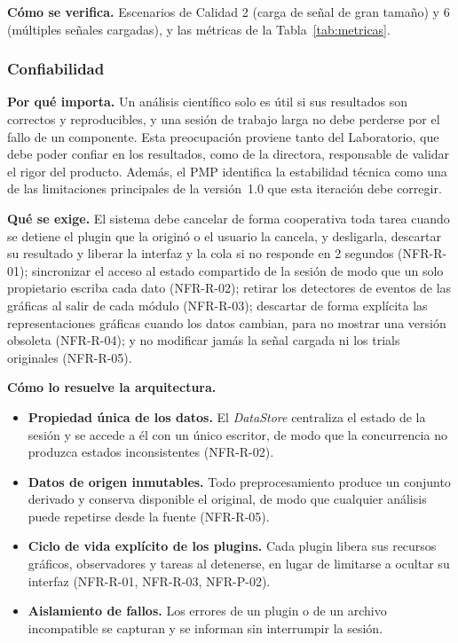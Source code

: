 \documentclass[11pt,a4paper]{article}
\DeclareRobustCommand{\_}{\textunderscore\allowbreak}
\begin{document}
\textbf{Cómo se verifica.} Escenarios de Calidad 2 (carga de señal de gran tamaño) y 6 (múltiples señales cargadas), y las métricas de la Tabla~\ref{tab:metricas}.

\subsubsection{Confiabilidad}

\textbf{Por qué importa.} Un análisis científico solo es útil si sus resultados son correctos y reproducibles, y una sesión de trabajo larga no debe perderse por el fallo de un componente. Esta preocupación proviene tanto del Laboratorio, que debe poder confiar en los resultados, como de la directora, responsable de validar el rigor del producto. Además, el PMP identifica la estabilidad técnica como una de las limitaciones principales de la versión~1.0 que esta iteración debe corregir.

\textbf{Qué se exige.} El sistema debe cancelar de forma cooperativa toda tarea cuando se detiene el plugin que la originó o el usuario la cancela, y desligarla, descartar su resultado y liberar la interfaz y la cola si no responde en 2 segundos (NFR-R-01); sincronizar el acceso al estado compartido de la sesión de modo que un solo propietario escriba cada dato (NFR-R-02); retirar los detectores de eventos de las gráficas al salir de cada módulo (NFR-R-03); descartar de forma explícita las representaciones gráficas cuando los datos cambian, para no mostrar una versión obsoleta (NFR-R-04); y no modificar jamás la señal cargada ni los trials originales (NFR-R-05).

\textbf{Cómo lo resuelve la arquitectura.}
\begin{itemize}[nosep]
    \item \textbf{Propiedad única de los datos.} El \textit{DataStore} centraliza el estado de la sesión y se accede a él con un único escritor, de modo que la concurrencia no produzca estados inconsistentes (NFR-R-02).
    \item \textbf{Datos de origen inmutables.} Todo preprocesamiento produce un conjunto derivado y conserva disponible el original, de modo que cualquier análisis puede repetirse desde la fuente (NFR-R-05).
    \item \textbf{Ciclo de vida explícito de los plugins.} Cada plugin libera sus recursos gráficos, observadores y tareas al detenerse, en lugar de limitarse a ocultar su interfaz (NFR-R-01, NFR-R-03, NFR-P-02).
    \item \textbf{Aislamiento de fallos.} Los errores de un plugin o de un archivo incompatible se capturan y se informan sin interrumpir la sesión.
\end{itemize}
\end{document}
